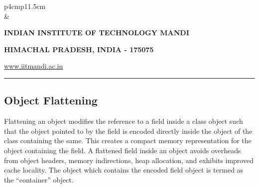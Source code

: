 \documentclass[12 pt, a4paper]{article}
\newcommand{\HRule}{\rule{\linewidth}{1mm}}
\begin{document}
\clearpage

\pagestyle{empty}
\vskip 0.2cm
	\begin{tabular}{p{4cm}p{11.5cm}}
		  \\
		& \centering \large\bf\phantom{Empty line}\\ 
		\rule{0pt}{1pt} \centering \large\bf{INDIAN INSTITUTE OF TECHNOLOGY MANDI} \\
		\rule{0pt}{1pt} \centering \large\bf{HIMACHAL PRADESH, INDIA - 175075} \\
		\rule{0pt}{1pt} \centering \underline{\href{www.iitmandi.ac.in}{www.iitmandi.ac.in}}\\
	\end{tabular}
\noindent

{\raggedleft{}\HRule}

\subsection{Object Flattening}
Flattening an object modifies the reference to a field inside a class object 
such that the object pointed to by the field is encoded directly inside the 
object of the class containing the same. This creates a compact memory representation
for the object containing the field.  
A flattened field inside an object avoids overheads from object headers, 
memory indirections, heap allocation, and exhibits improved cache locality.
The object which contains the encoded
field object is termed as the ``container'' object. 
\end{document}
